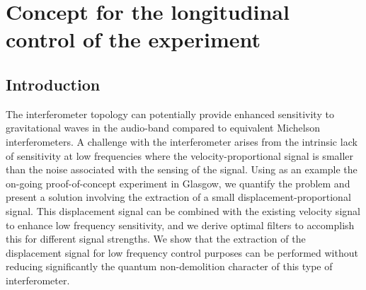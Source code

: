 \chapter{\label{c:speedmeter-control}Concept for the longitudinal control of the \SSM{} experiment}

\newcommand{\RT}{$\textrm{R}_{\textrm{T}}$}
\newcommand{\MINT}{$\textrm{M}_{\textrm{I}}$}
\newcommand{\MSIX}{$\textrm{M}_{\textrm{6}}$}
\newcommand{\MSEVEN}{$\textrm{M}_{\textrm{7}}$}
\newcommand{\MELEVEN}{$\textrm{M}_{\textrm{11}}$}
\newcommand{\MSIXTEEN}{$\textrm{M}_{\textrm{16}}$}


\section{Introduction}

The \SSM{} interferometer topology can potentially provide enhanced sensitivity to gravitational waves in the audio-band compared to equivalent Michelson interferometers. A challenge with the \SSM{} interferometer arises from the intrinsic lack of sensitivity at low frequencies where the velocity-proportional signal is smaller than the noise associated with the sensing of the signal. Using as an example the on-going proof-of-concept \SSM{} experiment in Glasgow, we quantify the problem and present a solution involving the extraction of a small displacement-proportional signal. This displacement signal can be combined with the existing velocity signal to enhance low frequency sensitivity, and we derive optimal filters to accomplish this for different signal strengths. We show that the extraction of the displacement signal for low frequency control purposes can be performed without reducing significantly the quantum non-demolition character of this type of interferometer.

